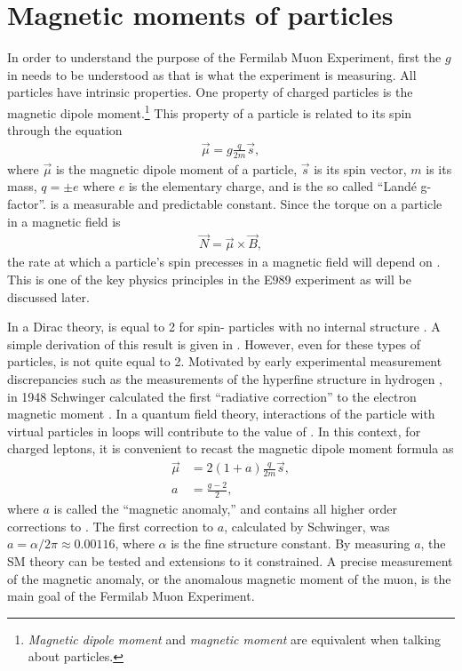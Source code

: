 \section{Magnetic moments of particles}
\label{sec:MDMs}

In order to understand the purpose of the Fermilab Muon \gmtwo Experiment, first the $g$ in \gmtwo needs to be understood as that is what the experiment is measuring. All particles have intrinsic properties. One property of charged particles is the magnetic dipole moment.\footnote{\textit{Magnetic dipole moment} and \textit{magnetic moment} are equivalent when talking about particles.} This property of a particle is related to its spin through the equation
		\begin{align}
            \vec{\mu} = g \frac{q}{2m} \vec{s},
        \label{eq:magneticmoment}
		\end{align}
where $\vec{\mu}$ is the magnetic dipole moment of a particle, $\vec{s}$ is its spin vector, $m$ is its mass, $q = \pm e$ where $e$ is the elementary charge, and \g is the so called ``Land\'{e} g-factor''. \g is a measurable and predictable constant. Since the torque on a particle in a magnetic field is 
		\begin{align}
            \vec{N} = \vec{\mu} \times \vec{B},
        \label{eq:torque}
		\end{align}
the rate at which a particle's spin precesses in a magnetic field will depend on \g. This is one of the key physics principles in the E989 experiment as will be discussed later.

In a Dirac theory, \g is equal to 2 for spin-\textonehalf\xspace particles with no internal structure \cite{Dirac}. A simple derivation of this result is given in . However, even for these types of particles, \g is not quite equal to 2. Motivated by early experimental measurement discrepancies such as the measurements of the hyperfine structure in hydrogen \cite{EarlyHyperfine1}, in 1948 Schwinger calculated the first ``radiative correction'' to the electron magnetic moment \cite{Schwinger}. In a quantum field theory, interactions of the particle with virtual particles in loops will contribute to the value of \g. In this context, for charged leptons, it is convenient to recast the magnetic dipole moment formula as 
		\begin{equation}
		\begin{aligned}
            \vec{\mu} &= 2(1+a) \frac{q}{2m} \vec{s}, \\
            a &= \frac{g-2}{2},
        \label{eq:anamoly}
		\end{aligned}
		\end{equation}
where $a$ is called the ``magnetic anomaly,'' and contains all higher order corrections to \g. The first correction to $a$, calculated by Schwinger, was $a = \alpha/2\pi \approx 0.00116$, where $\alpha$ is the fine structure constant. By measuring $a$, the SM theory can be tested and extensions to it constrained. A precise measurement of the magnetic anomaly, or the anomalous magnetic moment of the muon, is the main goal of the Fermilab Muon \gmtwo Experiment.


